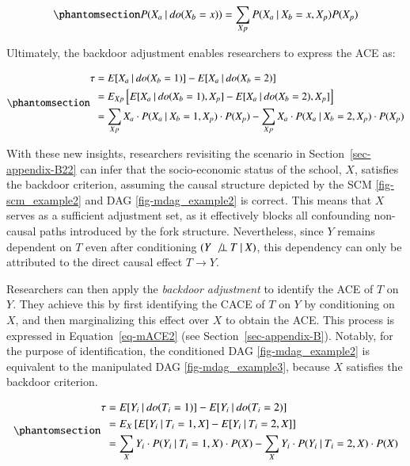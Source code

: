 \documentclass[
  authoryear,
  review,
  1p]{elsarticle}
\begin{document}
\begin{equation}\phantomsection\label{eq-backdoor}{
P(X_{a} \:|\:do(X_{b}=x)) = \sum_{Xp} P(X_{a} \:|\:X_{b}=x, X_{p}) P(X_{p})
}\end{equation}

Ultimately, the backdoor adjustment enables researchers to express the
ACE as:

\begin{equation}\phantomsection\label{eq-backdoor_adjustment}{
\begin{aligned}
\tau & = E[X_{a} \:|\:do(X_{b}=1)]- E[X_{a} \:|\:do(X_{b}=2)] \\
  & = E_{Xp}\left[ E[X_{a} \:|\:do(X_{b}=1), X_{p}]- E[X_{a} \:|\:do(X_{b}=2), X_{p}] \right] \\
  & = \sum_{Xp} X_{a} \cdot P(X_{a} \:|\:X_{b}=1, X_{p}) \cdot P(X_{p}) - \sum_{Xp} X_{a} \cdot P(X_{a} \:|\:X_{b}=2, X_{p}) \cdot P(X_{p})
\end{aligned}
}\end{equation}

With these new insights, researchers revisiting the scenario in
Section~\ref{sec-appendix-B22} can infer that the socio-economic status
of the school, \(X\), satisfies the backdoor criterion, assuming the
causal structure depicted by the SCM \ref{fig-scm_example2} and DAG
\ref{fig-mdag_example2} is correct. This means that \(X\) serves as a
sufficient adjustment set, as it effectively blocks all confounding
non-causal paths introduced by the fork structure. Nevertheless, since
\(Y\) remains dependent on \(T\) even after conditioning
\((Y \:\not\bot\:T \:|\:X)\), this dependency can only be attributed to
the direct causal effect \(T \rightarrow Y\).

Researchers can then apply the \emph{backdoor adjustment} to identify
the ACE of \(T\) on \(Y\). They achieve this by first identifying the
CACE of \(T\) on \(Y\) by conditioning on \(X\), and then marginalizing
this effect over \(X\) to obtain the ACE. This process is expressed in
Equation~\ref{eq-mACE2} (see Section~\ref{sec-appendix-B}). Notably, for
the purpose of identification, the conditioned DAG
\ref{fig-mdag_example2} is equivalent to the manipulated DAG
\ref{fig-mdag_example3}, because \(X\) satisfies the backdoor criterion.

\begin{equation}\phantomsection\label{eq-mACE2}{
\begin{aligned}
  \tau & = E[Y_{i} \:|\:do(T_{i}=1)]- E[Y_{i} \:|\:do(T_{i}=2)] \\
  & = E_{X}\left[ E[Y_{i} \:|\:T_{i}=1, X] - E[Y_{i} \:|\:T_{i}=2, X] \right] \\
  & = \sum_{X} Y_{i} \cdot P( Y_{i} \:|\:T_{i}=1, X) \cdot P(X) - \sum_{X} Y_{i} \cdot P( Y_{i} \:|\:T_{i}=2, X) \cdot P(X)
\end{aligned}
}\end{equation}
\end{document}
